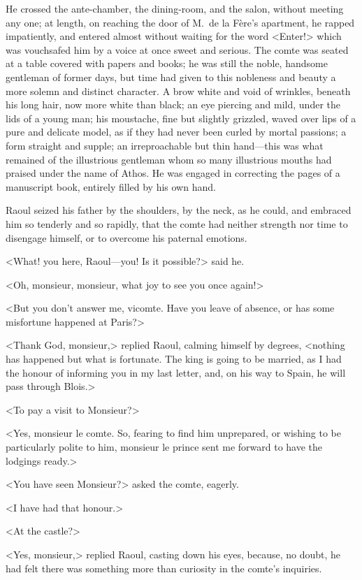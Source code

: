 He crossed the ante-chamber, the dining-room, and the salon, without meeting any one; at length, on reaching the door of M.~de la Fère's apartment, he rapped impatiently, and entered almost without waiting for the word <Enter!> which was vouchsafed him by a voice at once sweet and serious. The comte was seated at a table covered with papers and books; he was still the noble, handsome gentleman of former days, but time had given to this nobleness and beauty a more solemn and distinct character. A brow white and void of wrinkles, beneath his long hair, now more white than black; an eye piercing and mild, under the lids of a young man; his moustache, fine but slightly grizzled, waved over lips of a pure and delicate model, as if they had never been curled by mortal passions; a form straight and supple; an irreproachable but thin hand—this was what remained of the illustrious gentleman whom so many illustrious mouths had praised under the name of Athos. He was engaged in correcting the pages of a manuscript book, entirely filled by his own hand.

Raoul seized his father by the shoulders, by the neck, as he could, and embraced him so tenderly and so rapidly, that the comte had neither strength nor time to disengage himself, or to overcome his paternal emotions.

<What! you here, Raoul—you! Is it possible?> said he.

<Oh, monsieur, monsieur, what joy to see you once again!>

<But you don't answer me, vicomte. Have you leave of absence, or has some misfortune happened at Paris?>

<Thank God, monsieur,> replied Raoul, calming himself by degrees, <nothing has happened but what is fortunate. The king is going to be married, as I had the honour of informing you in my last letter, and, on his way to Spain, he will pass through Blois.>

<To pay a visit to Monsieur?>

<Yes, monsieur le comte. So, fearing to find him unprepared, or wishing to be particularly polite to him, monsieur le prince sent me forward to have the lodgings ready.>

<You have seen Monsieur?> asked the comte, eagerly.

<I have had that honour.>

<At the castle?>

<Yes, monsieur,> replied Raoul, casting down his eyes, because, no doubt, he had felt there was something more than curiosity in the comte's inquiries.

